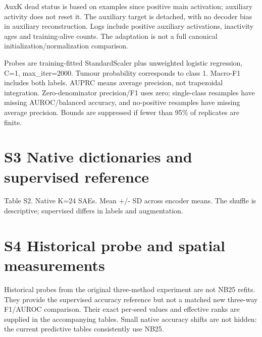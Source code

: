 \documentclass[10pt]{article}
\begin{document}
AuxK dead status is based on examples since positive main activation; auxiliary activity does not reset it. The auxiliary target is detached, with no decoder bias in auxiliary reconstruction. Logs include positive auxiliary activations, inactivity ages and training-alive counts. The adaptation is not a full canonical initialization/normalization comparison.

Probes are training-fitted StandardScaler plus unweighted logistic regression, C=1, max\_iter=2000. Tumour probability corresponds to class 1. Macro-F1 includes both labels. AUPRC means average precision, not trapezoidal integration. Zero-denominator precision/F1 uses zero; single-class resamples have missing AUROC/balanced accuracy, and no-positive resamples have missing average precision. Bounds are suppressed if fewer than 95\% of replicates are finite.

\clearpage
\section*{S3  Native dictionaries and supervised reference}
\begin{center}
\par\small Table S2. Native K=24 SAEs. Mean +/- SD across encoder means. The shuffle is descriptive; supervised differs in labels and augmentation.
\end{center}
\section*{S4  Historical probe and spatial measurements}
Historical probes from the original three-method experiment are not NB25 refits. They provide the supervised accuracy reference but not a matched new three-way F1/AUROC comparison. Their exact per-seed values and effective ranks are supplied in the accompanying tables. Small native accuracy shifts are not hidden: the current predictive tables consistently use NB25.
\end{document}
